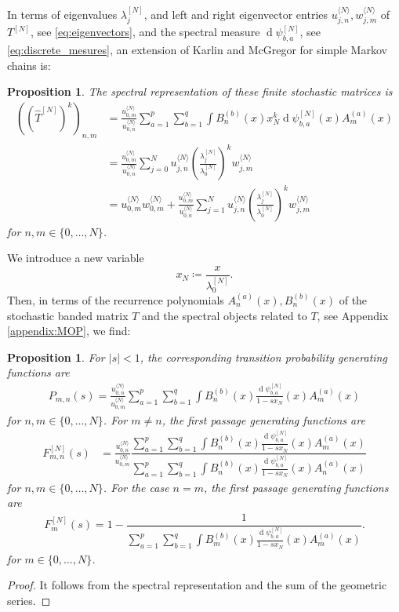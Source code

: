 \documentclass[11pt]{amsart}
\theoremstyle{plain}
\newtheorem{pro}[teo]{Proposition}
\renewcommand{\d}{\operatorname{d}}
\newcommand{\1}{\text{\fontseries{bx}\selectfont \textup 1}}
\begin{document}
In terms of eigenvalues $\lambda^{[N]}_j$, and left and right eigenvector entries $u_{j,n}^{\langle N\rangle},w_{j,m}^{\langle N\rangle}$ of $T^{[N]}$, see \eqref{eq:eigenvectors}, and the spectral measure $\d\psi^{[N]}_{b,a}$, see \eqref{eq:discrete_mesures}, an extension of Karlin and McGregor for simple Markov chains is:
\begin{pro}
	The spectral representation of these finite stochastic matrices is
	\[
	\begin{aligned}
		((\hat T^{[N]})^k)_{n,m}&=
		\frac{u_{0,m}^{\langle N\rangle}}{u_{0,n}^{\langle N\rangle}}
		\sum_{a=1}^p\sum_{b=1}^{q}	\int B^{(b)}_n(x)x_N^k\d\psi^{[N]}_{b,a}(x)A^{(a)}_{m}(x)\\&=
		\frac{u_{0,m}^{\langle N\rangle}}{u_{0,n}^{\langle N\rangle}}	\sum_{j=0}^N
		u_{j,n}^{\langle N\rangle}\left(\frac{\lambda^{[N]}_j}{\lambda_0^{[N]}}\right)^kw_{j,m}^{\langle N\rangle}
		\\&=u_{0,m}^{\langle N\rangle}w_{0,m}^{\langle N\rangle}+
		\frac{u_{0,m}^{\langle N\rangle}}{u_{0,n}^{\langle N\rangle}}	\sum_{j=1}^N u_{j,n}^{\langle N\rangle}\left(\frac{\lambda^{[N]}_j}{\lambda_0^{[N]}}\right)^kw_{j,m}^{\langle N\rangle}
	\end{aligned}
	\]
	for $n,m\in\{0,\dots,N\}$.
\end{pro}

We introduce a new variable
\[
x_N\coloneq \frac{x}{\lambda_0^{[N]}}.
\]
Then, in terms of the recurrence polynomials $A^{(a)}_n(x),B^{(b)}_n(x)$ of the stochastic banded matrix $T$ and the spectral objects related to $T$, see Appendix \ref{appendix:MOP}, we find:


\begin{pro}
	For $|s|<1$, the corresponding transition probability generating functions are
	\[
	\begin{aligned}
		P_{m,n}(s)=	\frac{u_{0,n}^{\langle N\rangle}}{u_{0,m}^{\langle N\rangle}}\sum_{a=1}^p\sum_{b=1}^{q}	\int B^{(b)}_n(x)\frac{\d\psi^{[N]}_{b,a}}{1-sx_N}(x)A^{(a)}_{m}(x)
	\end{aligned}
	\]
	for $n,m\in\{0,\dots,N\}$.
	For $m\neq n$, the first passage generating functions are
	\begin{align*}
		F_{m,n}^{[N]}(s)&=\frac{u_{0,n}^{\langle N\rangle}}{u_{0,m}^{\langle N\rangle}}
		\dfrac{\sum_{a=1}^p\sum_{b=1}^{q}	\int B^{(b)}_n(x)\frac{\d\psi^{[N]}_{b,a}}{1-sx_N}(x)A^{(a)}_{m}(x)}{\sum_{a=1}^p\sum_{b=1}^{q}	\int B^{(b)}_n(x)\frac{\d\psi^{[N]}_{b,a}}{1-sx_N}(x)A^{(a)}_{n}(x)}
	\end{align*}
	for $n,m\in\{0,\dots,N\}$.
	For the case $n=m$, the first passage generating functions are
	\begin{align*}
		F_{m}^{[N]}(s)=1-\dfrac{1}{\sum_{a=1}^p\sum_{b=1}^{q}	\int B^{(b)}_m(x)\frac{\d\psi^{[N]}_{b,a}}{1-sx_N}(x)A^{(a)}_{m}(x)}.
	\end{align*}
	for $m\in\{0,\dots,N\}$.
	
\end{pro}
\begin{proof}
	It follows from the spectral representation and the sum of the geometric series.
\end{proof}
\end{document}
